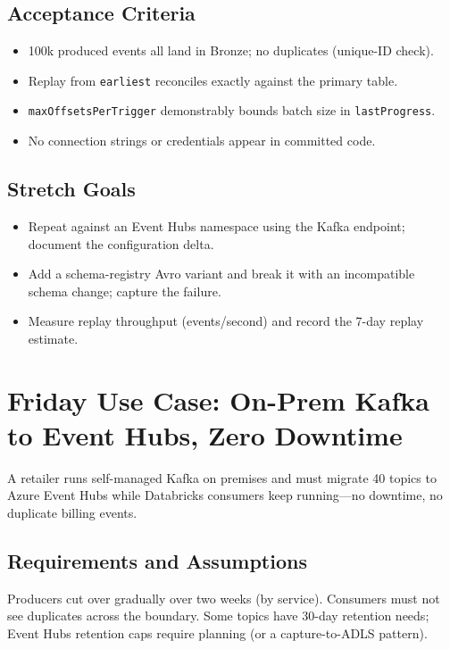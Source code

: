 \subsection*{Acceptance Criteria}
\begin{itemize}
    \item 100k produced events all land in Bronze; no duplicates (unique-ID check).
    \item Replay from \texttt{earliest} reconciles exactly against the primary table.
    \item \texttt{maxOffsetsPerTrigger} demonstrably bounds batch size in \texttt{lastProgress}.
    \item No connection strings or credentials appear in committed code.
\end{itemize}

\subsection*{Stretch Goals}
\begin{itemize}
    \item Repeat against an Event Hubs namespace using the Kafka endpoint; document the configuration delta.
    \item Add a schema-registry Avro variant and break it with an incompatible schema change; capture the failure.
    \item Measure replay throughput (events/second) and record the 7-day replay estimate.
\end{itemize}

\section{Friday Use Case: On-Prem Kafka to Event Hubs, Zero Downtime}
A retailer runs self-managed Kafka on premises and must migrate 40 topics to Azure Event Hubs while Databricks consumers keep running---no downtime, no duplicate billing events.

\subsection{Requirements and Assumptions}
Producers cut over gradually over two weeks (by service). Consumers must not see duplicates across the boundary. Some topics have 30-day retention needs; Event Hubs retention caps require planning (or a capture-to-ADLS pattern).

